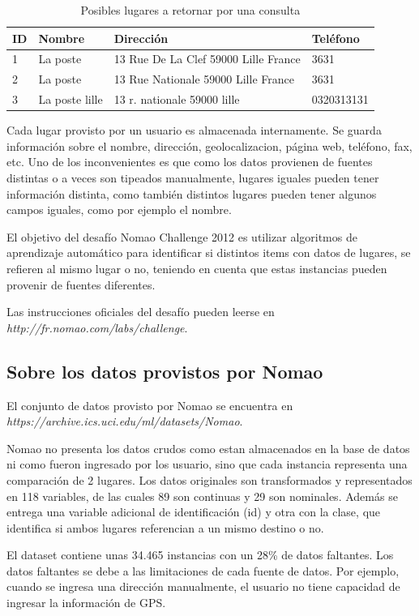 \documentclass[journal]{IEEEtran}
\begin{document}
\begin{table}[ht!]
\caption{Posibles lugares a retornar por una consulta}
\label{table:example1}
\centering
\begin{tabular}{l | l l l }
ID & Nombre & Dirección & Teléfono  \\
\hline
1 & La poste & 13 Rue De La Clef 59000 Lille France & 3631 \\ 
2 & La poste & 13 Rue Nationale 59000 Lille France & 3631 \\
3 & La poste lille & 13 r. nationale 59000 lille & 0320313131 \\
\end{tabular}
\end{table}

Cada lugar provisto por un usuario es almacenada internamente. Se guarda
información sobre el nombre, dirección, geolocalizacion, página web,
teléfono, fax, etc. Uno de los inconvenientes es que como los datos
provienen de fuentes distintas o a veces son tipeados manualmente,
lugares iguales pueden tener información distinta, como también
distintos lugares pueden tener algunos campos iguales, como por 
ejemplo el nombre.

El objetivo del desafío Nomao Challenge 2012 es utilizar 
algoritmos de aprendizaje automático para identificar si 
distintos items con datos de lugares, se refieren al mismo
lugar o no, teniendo en cuenta que estas instancias
pueden provenir de fuentes diferentes.

Las instrucciones oficiales del desafío pueden leerse en 
\textit{http://fr.nomao.com/labs/challenge}.

\subsection{Sobre los datos provistos por Nomao}

El conjunto de datos provisto por Nomao se encuentra en
\textit{https://archive.ics.uci.edu/ml/datasets/Nomao}. 

Nomao no presenta los datos crudos como estan almacenados en la 
base de datos ni como fueron ingresado por los usuario, sino que  
cada instancia representa una comparación de 
2 lugares. Los datos originales son transformados y representados
en 118 variables, de las cuales 89 son continuas y 29 son
nominales. Además se entrega una variable adicional de identificación (id) y
otra con la clase, que identifica si ambos lugares referencian a un mismo
destino o no. 

El dataset contiene unas 34.465 instancias con un 28\% de datos faltantes.
Los datos faltantes se debe a las limitaciones de cada fuente de datos. Por
ejemplo, cuando se ingresa una dirección manualmente, el usuario no tiene
capacidad de ingresar la información de GPS.
\end{document}
